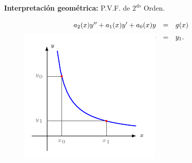 \documentclass{beamer}
\begin{document}
\begin{frame}[t]
	\begin{block}{}
	\textbf{Interpretación geométrica:} P.V.F. de \(2^{do}\) Orden.
	\[
		\begin{array}{rcl}
			a_2(x) y'' +a_1(x) y' + a_0(x) y & = & g(x) \\[2mm]
			y(x_0) = y_0 , \hspace{4mm} y(x_1) & = & y_1. \vspace{-1cm}
		\end{array}
	\]
		\begin{figure}[ht]
			\centering
			\includegraphics[width= 0.55 \linewidth]{IMAGENES/4/tikz.pdf}
		\end{figure}
	\end{block}
\end{frame}
\end{document}
